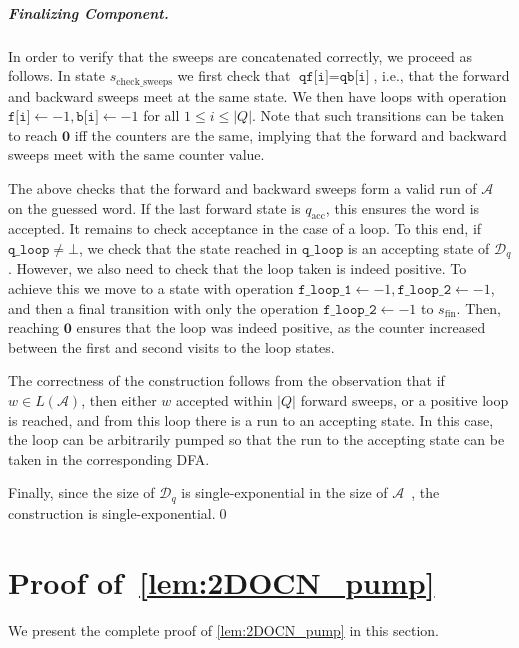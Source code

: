 \documentclass[11pt,a4paper]{amsart}
\theoremstyle{definition}
\newcommand{\accstate}{q_{\mathrm{acc}}}
\renewcommand{\vec}[1]{\boldsymbol{#1}}
\newcommand{\adds}[1]{\leftarrow #1}
\newcommand{\vf}[1]{\texttt{#1}}
\newcommand{\cA}{\mathcal{A}}
\newcommand{\cD}{\mathcal{D}}
\begin{document}
\subparagraph*{Finalizing Component.} In order to verify that the sweeps are
concatenated correctly, we proceed as follows. In state
$s_{\textrm{check\_sweeps}}$ we first check that $\vf{qf[i]}=\vf{qb[i]}$, i.e.,
that the forward and backward sweeps meet at the same state. We then have loops
with operation $\vf{f[i]}\adds{-1},\vf{b[i]}\adds{-1}$ for all $1\le i\le |Q|$. Note
that such transitions can be taken to reach $\vec{0}$ iff the counters are the
same, implying that the forward and backward sweeps meet with the same counter
value.

The above checks that the forward and backward sweeps form a valid run of $\cA$
on the guessed word. If the last forward state is $\accstate$, this ensures the
word is accepted. It remains to check acceptance in the case of a loop.  To this
end, if $\vf{q\_loop}\neq \bot$, we check that the state reached in $\vf{q\_loop}$ is
an accepting state of $\cD_q$. However, we also need to check that the loop
taken is indeed positive. To achieve this we move to a state with operation
$\vf{f\_loop\_1}\adds{-1},\vf{f\_loop\_2}\adds{-1}$, and then a final transition
with only the operation $\vf{f\_loop\_2}\adds{-1}$ to $s_{\textrm{fin}}$. Then,
reaching $\vec{0}$ ensures that the loop was indeed positive, as the counter
increased between the first and second visits to the loop states.

The correctness of the construction follows from the observation that if $w\in
L(\cA)$, then either $w$ accepted within $|Q|$ forward sweeps, or a positive
loop is reached, and from this loop there is a run to an accepting state. In
this case, the loop can be arbitrarily pumped so that the run to the accepting
state can be taken in the corresponding DFA.

Finally, since the size of $\cD_q$ is single-exponential in the size of
$\cA$~\cite{shepherdson1959reduction,rabin1959finite,vardi1989note}, the
construction is single-exponential.\hfill \qed



\section{Proof of~\cref{lem:2DOCN_pump}}
\label{apx:proofs_nondet_vs_det}
We present the complete proof of \cref{lem:2DOCN_pump} in this
section. 
\end{document}
